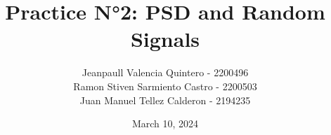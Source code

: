 \documentclass{journal}[IEEEtran, twocolumn]             %
\newcommand{\dochead}{Practice N°2}
\newcommand{\docsubhead}{PSD and Random Signals}
\newcommand{\titulo}{\dochead: \docsubhead}
\newcommand{\fecha}{March 10, 2024}
\begin{document}

\title{\textbf{\titulo}}            %

\author{
Jeanpaull Valencia Quintero - 2200496 \\
Ramon Stiven Sarmiento Castro - 2200503 \\
Juan Manuel Tellez Calderon - 2194235
}


\date{\fecha}                       %

\maketitle                          %
\thispagestyle{fancy}               %


\color{black}
\end{document}
